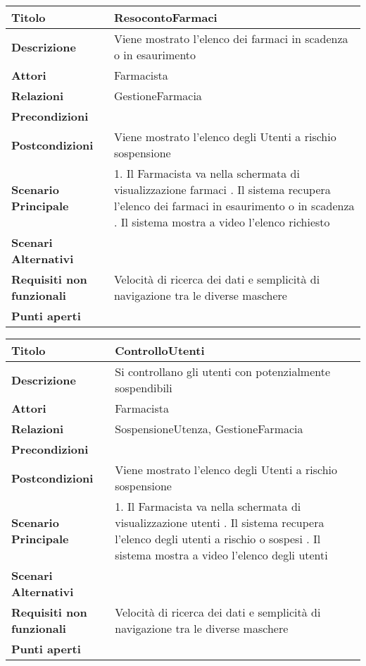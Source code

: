 \begin{tabular} {|P{4.5cm}|P{12.5cm}|}
  \hline
    \textbf{Titolo} & ResocontoFarmaci\\
  \hline
    \textbf{Descrizione} & Viene mostrato l'elenco dei farmaci in scadenza o in esaurimento\\
  \hline
    \textbf{Attori} & Farmacista\\
  \hline
    \textbf{Relazioni} & GestioneFarmacia\\
  \hline
    \textbf{Precondizioni} &\\
  \hline
    \textbf{Postcondizioni} & Viene mostrato l'elenco degli Utenti a rischio sospensione\\
  \hline
    \textbf{Scenario Principale} & 1. Il Farmacista va nella schermata di
    visualizzazione farmaci . Il sistema recupera l'elenco dei
    farmaci in esaurimento o in scadenza . Il sistema mostra a video
    l'elenco richiesto\\
  \hline
    \textbf{Scenari Alternativi} &\\
  \hline
    \textbf{Requisiti non funzionali} & Velocità di ricerca dei dati e
    semplicità di navigazione tra le diverse maschere\\
  \hline
    \textbf{Punti aperti} &\\
  \hline
\end{tabular}
\hfill
\break

\begin{tabular} {|P{4.5cm}|P{12.5cm}|}
\hline
  \textbf{Titolo} & ControlloUtenti\\
\hline
  \textbf{Descrizione} & Si controllano gli utenti con potenzialmente sospendibili\\
\hline
  \textbf{Attori} & Farmacista\\
\hline
  \textbf{Relazioni} & SospensioneUtenza, GestioneFarmacia\\
\hline
  \textbf{Precondizioni} &\\
\hline
  \textbf{Postcondizioni} & Viene mostrato l'elenco degli Utenti a rischio sospensione\\
\hline
  \textbf{Scenario Principale} & 1. Il Farmacista va nella schermata di
  visualizzazione utenti . Il sistema recupera l'elenco degli
  utenti a rischio o sospesi . Il sistema mostra a video l'elenco
  degli utenti\\
\hline
  \textbf{Scenari Alternativi} &\\
\hline
  \textbf{Requisiti non funzionali} & Velocità di ricerca dei dati e semplicità di navigazione tra le diverse maschere\\
\hline
  \textbf{Punti aperti} & \\
\hline
\end{tabular}
\hfill
\break

